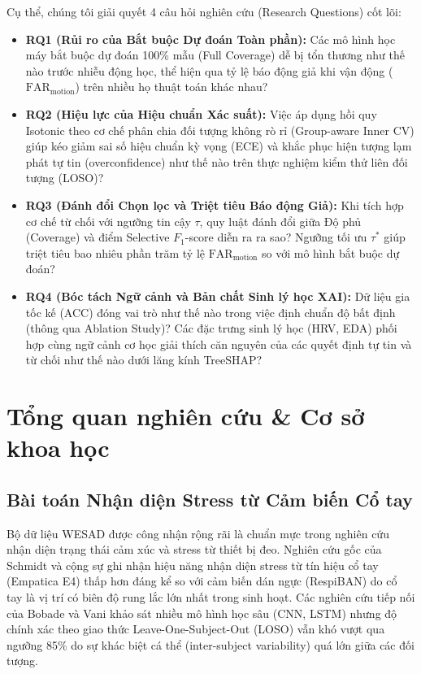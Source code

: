 \documentclass[conference]{IEEEtran}
\begin{document}
Cụ thể, chúng tôi giải quyết 4 câu hỏi nghiên cứu (Research Questions) cốt lõi:
\begin{itemize}
    \item \textbf{RQ1 (Rủi ro của Bắt buộc Dự đoán Toàn phần):} Các mô hình học máy bắt buộc dự đoán 100\% mẫu (Full Coverage) dễ bị tổn thương như thế nào trước nhiễu động học, thể hiện qua tỷ lệ báo động giả khi vận động ($\text{FAR}_{\text{motion}}$) trên nhiều họ thuật toán khác nhau?
    \item \textbf{RQ2 (Hiệu lực của Hiệu chuẩn Xác suất):} Việc áp dụng hồi quy Isotonic theo cơ chế phân chia đối tượng không rò rỉ (Group-aware Inner CV) giúp kéo giảm sai số hiệu chuẩn kỳ vọng (ECE) và khắc phục hiện tượng lạm phát tự tin (overconfidence) như thế nào trên thực nghiệm kiểm thử liên đối tượng (LOSO)?
    \item \textbf{RQ3 (Đánh đổi Chọn lọc và Triệt tiêu Báo động Giả):} Khi tích hợp cơ chế từ chối với ngưỡng tin cậy $\tau$, quy luật đánh đổi giữa Độ phủ (Coverage) và điểm Selective $F_1$-score diễn ra ra sao? Ngưỡng tối ưu $\tau^*$ giúp triệt tiêu bao nhiêu phần trăm tỷ lệ $\text{FAR}_{\text{motion}}$ so với mô hình bắt buộc dự đoán?
    \item \textbf{RQ4 (Bóc tách Ngữ cảnh và Bản chất Sinh lý học XAI):} Dữ liệu gia tốc kế (ACC) đóng vai trò như thế nào trong việc định chuẩn độ bất định (thông qua Ablation Study)? Các đặc trưng sinh lý học (HRV, EDA) phối hợp cùng ngữ cảnh cơ học giải thích căn nguyên của các quyết định tự tin và từ chối như thế nào dưới lăng kính TreeSHAP?
\end{itemize}

\section{Tổng quan nghiên cứu \& Cơ sở khoa học}

\subsection{Bài toán Nhận diện Stress từ Cảm biến Cổ tay}
Bộ dữ liệu WESAD \cite{schmidt2018wesad} được công nhận rộng rãi là chuẩn mực trong nghiên cứu nhận diện trạng thái cảm xúc và stress từ thiết bị đeo. Nghiên cứu gốc của Schmidt và cộng sự ghi nhận hiệu năng nhận diện stress từ tín hiệu cổ tay (Empatica E4) thấp hơn đáng kể so với cảm biến dán ngực (RespiBAN) do cổ tay là vị trí có biên độ rung lắc lớn nhất trong sinh hoạt. Các nghiên cứu tiếp nối của Bobade và Vani \cite{bobade2020stress} khảo sát nhiều mô hình học sâu (CNN, LSTM) nhưng độ chính xác theo giao thức Leave-One-Subject-Out (LOSO) vẫn khó vượt qua ngưỡng 85\% do sự khác biệt cá thể (inter-subject variability) quá lớn giữa các đối tượng.
\end{document}
